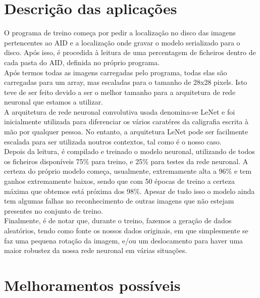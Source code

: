 \documentclass[extendedabs]{vcom}
\begin{document}
\section{Descrição das aplicações}

O programa de treino começa por pedir a localização no disco das imagens pertencentes ao AID e a localização onde gravar o modelo serializado para o disco. Após isso, é procedida à leitura de uma percentagem de ficheiros dentro de cada pasta do AID, definida no próprio programa. \\
Após termos todas as imagens carregadas pelo programa, todas elas são carregadas para um array, mas escaladas para o tamanho de 28x28 pixels. Isto teve de ser feito devido a ser o melhor tamanho para a arquitetura de rede neuronal que estamos a utilizar. \\
A arquitetura de rede neuronal convolutiva usada denomina-se LeNet e foi inicialmente utilizada para diferenciar os vários caratéres da caligrafia escrita à mão por qualquer pessoa. No entanto, a arquitetura LeNet pode ser facilmente escalada para ser utilizada noutros contextos, tal como é o nosso caso. \\
Depois da leitura, é compilado e treinado o modelo neuronal, utilizando de todos os ficheiros disponíveis 75\% para treino, e 25\% para testes da rede neuronal. A certeza do próprio modelo começa, usualmente, extremamente alta a 96\% e tem ganhos extremamente baixos, sendo que com 50 épocas de treino a certeza máxima que obtemos está próxima dos 98\%. Apesar de tudo isso o modelo ainda tem algumas falhas no reconhecimento de outras imagens que não estejam presentes no conjunto de treino. \\
Finalmente, é de notar que, durante o treino, fazemos a geração de dados aleatórios, tendo como fonte os nossos dados originais, em que simplesmente se faz uma pequena rotação da imagem, e/ou um deslocamento para haver uma maior robustez da nossa rede neuronal em várias situações. \\

\section{Melhoramentos possíveis}
\end{document}
